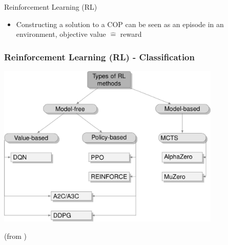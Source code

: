\documentclass[aspectratio=1610]{beamer}
\newcommand{\important}[1]{{\color{green!60!black}#1}}
\renewcommand{\footnotesize}{\scriptsize}
\begin{document}
\begin{frame}{Reinforcement Learning (RL)}
\begin{itemize}
		\vspace{2ex}
		\item<2> \alert{Constructing a solution to a COP can be seen as an episode in an environment, objective value $\hat=$ reward}
	\end{itemize}
\end{frame}


\begin{frame}
	\frametitle{Reinforcement Learning (RL) - Classification}
	\begin{center}
		\includegraphics[width=0.8\textwidth]{figures/rlmethods.jpg}

		\bigskip
		\footnotesize{(from \citet{mazyavkina-21b})}
	\end{center}
\end{frame}


		
\end{document}
